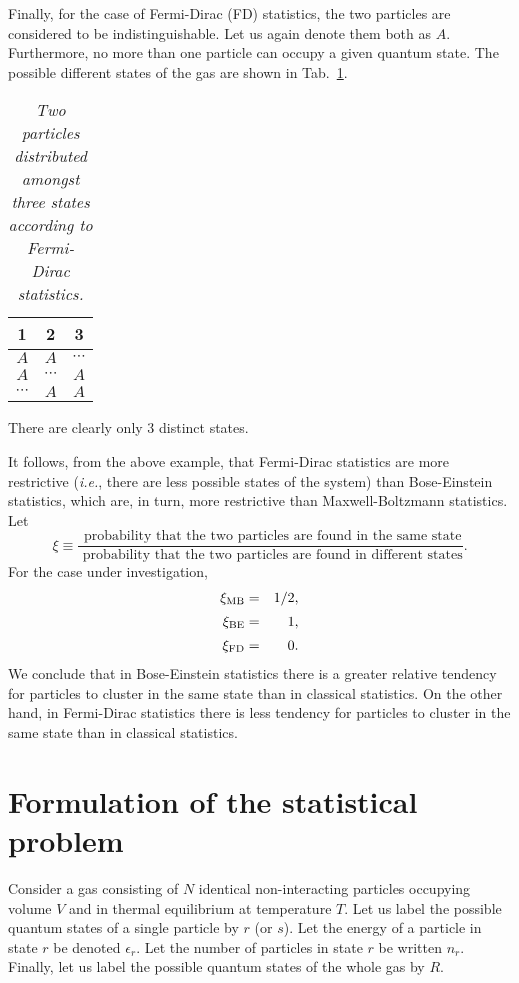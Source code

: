 Finally, for the case of Fermi-Dirac (FD) statistics, the two particles are
considered to be indistinguishable. Let us again denote them both as $A$.
Furthermore, no more than one particle  can occupy a given quantum state. The possible different states of the gas are shown in Tab.~\ref{tfd}.
\begin{table}[h]\centering
\begin{tabular}{ccc}\hline 1&2&3 \\\hline
$A$      & $A$      & $\cdots$ \\
$A$      & $\cdots$ & $A$      \\
$\cdots$ & $A$      & $A$      \\\hline
\end{tabular}
\caption{\em Two particles distributed amongst three states according to
Fermi-Dirac statistics.}\label{tfd}
\end{table}
There are clearly only 3  distinct states.

It follows, from the above example, that Fermi-Dirac statistics are
more restrictive ({\em i.e.}, there are less possible states of the
system) than Bose-Einstein statistics, which are, in turn, more restrictive
than Maxwell-Boltzmann statistics. Let
\begin{equation}
\xi \equiv \frac{\mbox{ probability that the two particles are found in the
same state}}{\mbox{ probability that the two particles are found in different
states}}.
\end{equation}
For the case under investigation,
\begin{eqnarray}
\xi_{\rm MB} &=& 1/2,\\[0.5ex]
\xi_{\rm BE} &=& 1,\\[0.5ex]
\xi_{\rm FD} &=& 0.
\end{eqnarray}
We conclude that in Bose-Einstein statistics there is a greater relative
tendency for particles to cluster in the same state than in classical
statistics. On the other hand, in Fermi-Dirac statistics there is
less tendency for particles to cluster in the same state than
in classical statistics.

\section{Formulation of the statistical problem}
Consider a gas consisting of $N$ identical non-interacting particles
occupying volume $V$ and in thermal equilibrium at temperature $T$. 
Let us label the possible quantum states of a single particle by $r$ (or $s$). 
Let the energy of a particle in state $r$ be denoted $\epsilon_r$. 
Let the number of particles in state $r$ be written $n_r$. Finally,
let us label the possible quantum states of the whole gas by $R$.

